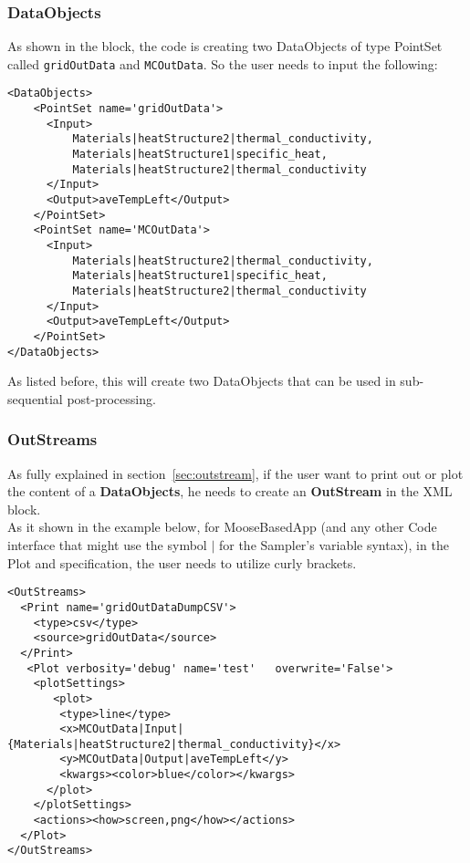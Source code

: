 \subsubsection{DataObjects}
As shown in the  block, the code is creating two DataObjects of type PointSet
called \texttt{gridOutData} and \texttt{MCOutData}.
%
So the user needs to input the following:
\begin{lstlisting}[style=XML]
<DataObjects>
    <PointSet name='gridOutData'>
      <Input>
          Materials|heatStructure2|thermal_conductivity,
          Materials|heatStructure1|specific_heat,
          Materials|heatStructure2|thermal_conductivity
      </Input>
      <Output>aveTempLeft</Output>
    </PointSet>
    <PointSet name='MCOutData'>
      <Input>
          Materials|heatStructure2|thermal_conductivity,
          Materials|heatStructure1|specific_heat,
          Materials|heatStructure2|thermal_conductivity
      </Input>
      <Output>aveTempLeft</Output>
    </PointSet>
</DataObjects>
\end{lstlisting}
As listed before, this will create two DataObjects that can be used in sub-sequential post-processing.
\subsubsection{OutStreams}
As fully explained in section~\ref{sec:outstream}, if the user want to print out or plot the content of a \textbf{DataObjects},
he needs to create an \textbf{OutStream} in the  XML block.
\\As it shown in the example below, for MooseBasedApp (and any other Code interface that might use the symbol $|$
for the Sampler's variable syntax), in the Plot  and  specification, the user needs to
utilize curly brackets.
\begin{lstlisting}[style=XML]
<OutStreams>
  <Print name='gridOutDataDumpCSV'>
    <type>csv</type>
    <source>gridOutData</source>
  </Print>
   <Plot verbosity='debug' name='test'   overwrite='False'>
    <plotSettings>
       <plot>
        <type>line</type>
        <x>MCOutData|Input|{Materials|heatStructure2|thermal_conductivity}</x>
        <y>MCOutData|Output|aveTempLeft</y>
        <kwargs><color>blue</color></kwargs>
      </plot>
    </plotSettings>
    <actions><how>screen,png</how></actions>
  </Plot>
</OutStreams>
\end{lstlisting}

